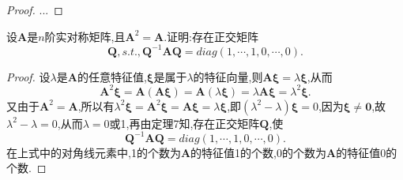 \documentclass[lang=cn,11pt,normal]{elegantbook}
\begin{document}
	\begin{proof}
		...
	\end{proof}
	\begin{exercise}
		设$\boldsymbol{A}$是$n$阶实对称矩阵,且$\boldsymbol{A}^2=\boldsymbol{A}$.证明:存在正交矩阵
		$$
		\boldsymbol{Q},s.t.,\boldsymbol{Q}^{-1}\boldsymbol{AQ}=diag(1,\cdots,1,0,\cdots,0).
		$$
	\end{exercise}
	\begin{proof}
		设$\lambda$是$\boldsymbol{A}$的任意特征值,$\boldsymbol{\xi}$是属于$\lambda$的特征向量,则$\boldsymbol{A\xi}=\lambda\boldsymbol{\xi}$,从而
		$$
		\boldsymbol{A}^2\boldsymbol{\xi}=\boldsymbol{A}(\boldsymbol{A\xi})=\boldsymbol{A}(\lambda\boldsymbol{\xi})=\lambda\boldsymbol{A\xi}=\lambda^2\boldsymbol{\xi}.
		$$
		又由于$\boldsymbol{A}^2=\boldsymbol{A}$,所以有$\lambda^2\boldsymbol{\xi}=\boldsymbol{A}^2\boldsymbol{\xi}=\boldsymbol{A\xi}=\lambda\boldsymbol{\xi}$,即$(\lambda^2-\lambda)\boldsymbol{\xi}=0$,因为$\boldsymbol{\xi}\ne\boldsymbol{0}$,故$\lambda^2-\lambda=0$,从而$\lambda=0$或1,再由定理7知,存在正交矩阵$\boldsymbol{Q}$,使
		$$
		\boldsymbol{Q}^{-1}\boldsymbol{AQ}=diag(1,\cdots,1,0,\cdots,0).
		$$
		在上式中的对角线元素中,1的个数为$\boldsymbol{A}$的特征值1的个数,0的个数为$\boldsymbol{A}$的特征值0的个数.
	\end{proof}
\end{document}
